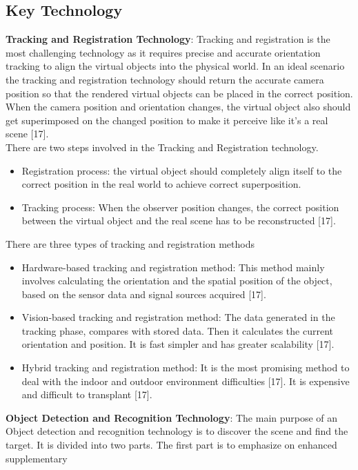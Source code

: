 \subsection{Key Technology}
\textbf{Tracking and Registration Technology}: Tracking and registration is the most 
challenging technology as it requires precise and accurate orientation tracking to align the 
virtual objects into the physical world. In an ideal scenario the tracking and registration 
technology should return the accurate camera position so that the rendered virtual objects 
can be placed in the correct position. When the camera position and orientation changes, 
the virtual object also should get superimposed on the changed position to make it 
perceive like it’s a real scene [17].
\\ There are two steps involved in the Tracking and Registration technology.
\begin{itemize}


\item Registration process: the virtual object should completely align itself to the 
correct position in the real world to achieve correct superposition.
\item Tracking process: When the observer position changes, the correct position 
between the virtual object and the real scene has to be reconstructed [17].  
\end{itemize}
 There are three types of tracking and registration methods 
 \begin{itemize}
 \item  Hardware-based tracking and registration method: This method mainly involves 
calculating the orientation and the spatial position of the object, based on the 
sensor data and signal sources acquired [17]. 
\item Vision-based tracking and registration method: The data generated in the tracking 
phase, compares with stored data. Then it calculates the current orientation and 
position. It is fast simpler and has greater scalability [17]. 
\item Hybrid tracking and registration method: It is the most promising method to deal 
with the indoor and outdoor environment difficulties [17]. It is expensive and 
difficult to transplant [17].
\end{itemize}   
\textbf{Object Detection and Recognition Technology}: The main purpose of an Object 
detection and recognition technology is to discover the scene and find the target. It is 
divided into two parts. The first part is to emphasize on enhanced supplementary 
